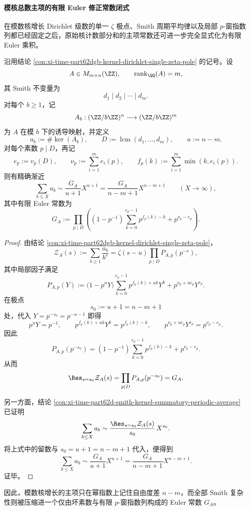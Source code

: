 \paragraph{模核总数主项的有限 Euler 修正常数闭式}
在模数核增长 Dirichlet 级数的单一 \(\zeta\) 极点、Smith 周期平均律以及局部 \(p\)-窗指数列都已经固定之后，原始核计数部分和的主项常数还可进一步完全显式化为有限 Euler 乘积。

\begin{theorem}\label{thm:xi-time-part62dgba-smith-kernel-tauberian-finite-euler-leading-constant}
沿用结论 \ref{con:xi-time-part62dgb-kernel-dirichlet-single-zeta-pole} 的记号。设
\[
A\in M_{m\times n}(\ZZ),
\qquad
\operatorname{rank}_{\QQ}(A)=m,
\]
其 Smith 不变量为
\[
d_1\mid d_2\mid \cdots \mid d_m.
\]
对每个 \(b\ge 1\)，记
\[
A_b:(\ZZ/b\ZZ)^n\longrightarrow (\ZZ/b\ZZ)^m
\]
为 \(A\) 在模 \(b\) 下的诱导映射，并定义
\[
a_b:=\#\ker(A_b),
\qquad
D:=\operatorname{lcm}(d_1,\dots,d_m),
\qquad
u:=n-m.
\]
对每个素数 \(p\mid D\)，再记
\[
e_p:=v_p(D),
\qquad
\nu_p:=\sum_{i=1}^{m}e_i(p),
\qquad
f_p(k):=\sum_{i=1}^{m}\min(k,e_i(p)).
\]
则有精确渐近
\[
\sum_{b\le X}a_b
\sim
\frac{G_A}{u+1}X^{u+1}
=
\frac{G_A}{n-m+1}X^{n-m+1}
\qquad (X\to\infty),
\]
其中有限 Euler 常数为
\[
G_A
:=
\prod_{p\mid D}
\left(
(1-p^{-1})\sum_{k=0}^{e_p-1}p^{f_p(k)-k}
+p^{\nu_p-e_p}
\right).
\]
\end{theorem}
\begin{proof}
由结论 \ref{con:xi-time-part62dgb-kernel-dirichlet-single-zeta-pole}，
\[
\mathcal Z_A(s):=\sum_{b\ge 1}\frac{a_b}{b^s}
=
\zeta(s-u)\prod_{p\mid D}P_{A,p}(p^{-s}),
\]
其中局部因子满足
\[
P_{A,p}(Y)
:=
\bigl(1-p^uY\bigr)\sum_{k=0}^{e_p-1}p^{f_p(k)+uk}Y^k
+p^{\nu_p+u e_p}Y^{e_p}.
\]
在极点
\[
s_0:=u+1=n-m+1
\]
处，代入 \(Y=p^{-s_0}=p^{-u-1}\) 即得
\[
p^uY=p^{-1},
\qquad
p^{f_p(k)+uk}Y^k=p^{f_p(k)-k},
\qquad
p^{\nu_p+u e_p}Y^{e_p}=p^{\nu_p-e_p}.
\]
因此
\[
P_{A,p}(p^{-s_0})
=
(1-p^{-1})\sum_{k=0}^{e_p-1}p^{f_p(k)-k}
+p^{\nu_p-e_p}.
\]
从而
\[
\Res_{s=s_0}\mathcal Z_A(s)
=
\prod_{p\mid D}P_{A,p}(p^{-s_0})
=
G_A.
\]

另一方面，结论 \ref{con:xi-time-part62d-smith-kernel-summatory-periodic-average} 已证明
\[
\sum_{b\le X}a_b
\sim
\frac{\Res_{s=s_0}\mathcal Z_A(s)}{s_0}\,X^{s_0}.
\]
将上式中的留数与 \(s_0=u+1=n-m+1\) 代入，便得到
\[
\sum_{b\le X}a_b
\sim
\frac{G_A}{u+1}X^{u+1}
=
\frac{G_A}{n-m+1}X^{n-m+1}.
\]
证毕。
\end{proof}

\noindent
因此，模数核增长的主项只在幂指数上记住自由度差 \(n-m\)，而全部 Smith 复杂性则被压缩进一个仅由坏素数与有限 \(p\)-窗指数列构成的 Euler 常数 \(G_A\)。

\endinput
